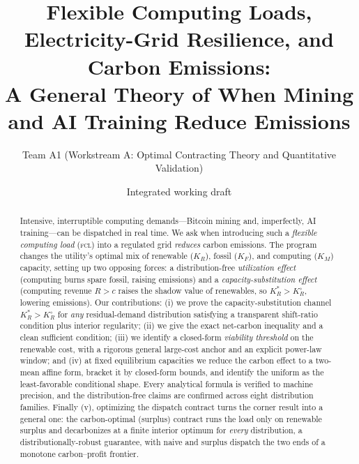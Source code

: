\documentclass[11pt,reqno]{amsart}
\theoremstyle{plain}
\theoremstyle{definition}\newtheorem{condition}{Condition}\newtheorem{assumption}{Assumption}
\theoremstyle{remark}\newtheorem{remark}{Remark}
\newcommand{\KR}{K_R}\newcommand{\KF}{K_F}\newcommand{\KM}{K_M}
\newcommand{\KRs}{K_R^{*}}\newcommand{\KFs}{K_F^{*}}\newcommand{\KMs}{K_M^{*}}
\newcommand{\KRo}{K_R^{\circ}}\newcommand{\KFo}{K_F^{\circ}}
\begin{document}
\title[Flexible Computing Loads, Grid Resilience, and Carbon Emissions]
{Flexible Computing Loads, Electricity-Grid Resilience, and Carbon Emissions:\\
A General Theory of When Mining and AI Training Reduce Emissions}
\author{Team A1 (Workstream A: Optimal Contracting Theory and Quantitative Validation)}
\date{Integrated working draft}

\begin{abstract}
Intensive, interruptible computing demands---Bitcoin mining and, imperfectly, AI
training---can be dispatched in real time. We ask when introducing such a
\emph{flexible computing load} (\textsc{fcl}) into a regulated grid \emph{reduces}
carbon emissions. The program changes the utility's optimal mix of renewable
($\KR$), fossil ($\KF$), and computing ($\KM$) capacity, setting up two opposing
forces: a distribution-free \emph{utilization effect} (computing burns spare
fossil, raising emissions) and a \emph{capacity-substitution effect} (computing
revenue $R>c$ raises the shadow value of renewables, so $\KRs>\KRo$, lowering
emissions). Our contributions: (i) we prove the capacity-substitution channel
$\KRs>\KRo$ for \emph{any} residual-demand distribution satisfying a transparent
shift-ratio condition plus interior regularity; (ii) we give the exact net-carbon
inequality and a clean sufficient condition; (iii) we identify a closed-form
\emph{viability threshold} on the renewable cost, with a rigorous general
large-cost anchor and an explicit power-law window; and (iv) at fixed equilibrium
capacities we reduce the carbon effect to a two-mean affine form, bracket it by
closed-form bounds, and identify the uniform as the least-favorable conditional
shape. Every analytical formula is verified to machine precision, and the
distribution-free claims are confirmed across eight distribution families. Finally
(v), optimizing the dispatch contract turns the corner result into a general one: the
carbon-optimal (surplus) contract runs the load only on renewable surplus and
decarbonizes at a finite interior optimum for \emph{every} distribution, a
distributionally-robust guarantee, with naive and surplus dispatch the two ends of a
monotone carbon--profit frontier.
\end{abstract}

\maketitle

\end{document}
